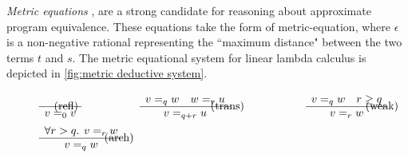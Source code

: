 \emph{Metric equations} \cite{mardare2016quantitative}, \cite{mardare2017axiomatizability} are a strong candidate for reasoning about approximate program equivalence. These equations take the form of \gls{metric-equation}, where  $\epsilon$ is a non-negative rational representing the ``maximum distance" between the two terms $t$ and $s$. The metric equational system for linear lambda calculus is depicted in \autoref{fig:metric deductive system}.

\begin{figure} [H]
\begin{equation*}
\begin{split}
\begin{aligned}
&
\begin{minipage}[t]{0.3\textwidth}
$\begin{array}{c}
     \\
    \hline
   v=_{0}v
\end{array}
$
\end{minipage}
\hspace{-90pt}
\text{(refl)} 
 \hspace{55pt}
\begin{minipage}[t]{0.3\textwidth}
$\begin{array}{c}
    v=_{q}w \quad w=_{r}u  \\
    \hline
   v=_{q + r} u
\end{array}
$ \end{minipage}
\hspace{-40pt} \text{(trans)} 
\hspace{55pt}
\begin{minipage}[t]{0.3\textwidth}
$\begin{array}{c}
    v=_{q}w \quad r\geq q  \\
    \hline
   v=_{r} w
\end{array}
$ \end{minipage}
\hspace{-50pt} \text{(weak)} \\
&
\begin{minipage}[t]{0.3\textwidth}
$\begin{array}{c}
    \forall r > q . \hspace{4pt} v=_{r} w \\
    \hline
   v=_{q}w
\end{array}
$
\end{minipage}
\hspace{-45pt}
\text{(arch)} 
 \hspace{50pt}
\begin{minipage}[t]{0.3\textwidth}

\end{minipage}
\end{aligned}
\end{split}
\end{equation*}
\end{figure}
